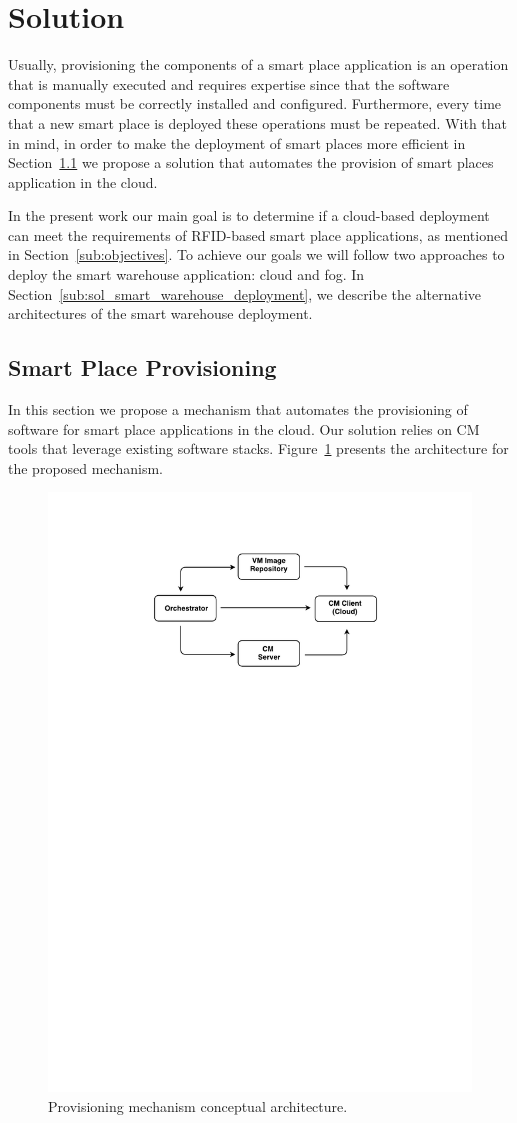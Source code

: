 
\section{Solution}
\label{sec:solution}
Usually, provisioning the components of a smart place application is an operation
that is manually executed and requires expertise since that the software components must
be correctly installed and configured. Furthermore, every time that a new smart place is deployed
these operations must be repeated. With that in mind, in order to make the deployment of
smart places more efficient in Section~\ref{subs:sol_provisioning} we propose a solution
that automates the provision of smart places application in the cloud.

In the present work our main goal is to determine if a cloud-based deployment can meet the
requirements of RFID-based smart place applications, as mentioned in Section~\ref{sub:objectives}.
To achieve our goals we will follow two approaches to deploy the smart warehouse application: cloud
and fog. In Section~\ref{sub:sol_smart_warehouse_deployment}, we describe the alternative
architectures of the smart warehouse deployment.

\subsection{Smart Place Provisioning}
\label{subs:sol_provisioning}
In this section we propose a mechanism that automates the provisioning of software for smart place
applications in the cloud. Our solution relies on \acrfull{CM} tools that leverage existing software
stacks. Figure~\ref{fig:provisioning_generic_architecture} presents the architecture for the proposed
mechanism.

\begin{figure}[ht!]
  \centering
  \includegraphics[width=.4\textwidth]{./figures/c4t-generic-solution.pdf}
  \caption[Provisioning mechanism conceptual architecture.]{Provisioning mechanism conceptual architecture.}
  \label{fig:provisioning_generic_architecture}
\end{figure}

